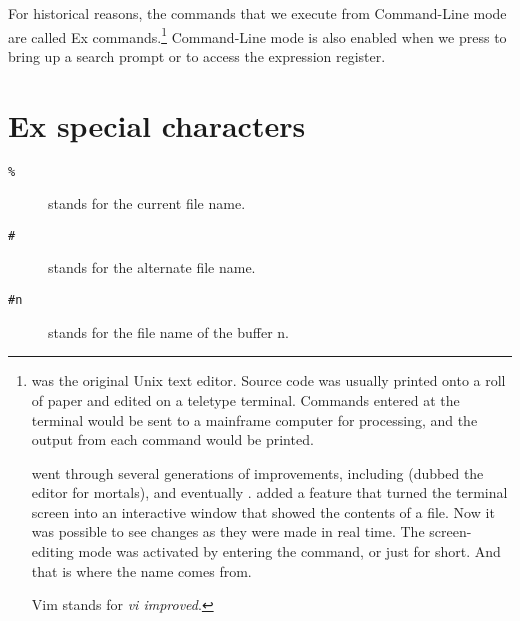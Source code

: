 For historical reasons, the commands that we execute from Command-Line mode are called Ex commands.\footnote{ was the original Unix text editor. Source code was usually printed onto a roll of paper and edited on a teletype terminal. Commands entered at the terminal would be sent to a mainframe computer for processing, and the output from each command would be printed.

 went through several generations of improvements, including  (dubbed the editor for mortals),  and eventually .  added a feature that turned the terminal screen into an interactive window that showed the contents of a file. Now it was possible to see changes as they were made in real time. The screen-editing mode was activated by entering the  command, or just  for short. And that is where the name  comes from.

Vim stands for \emph{vi improved}.} Command-Line mode is also enabled when we press \syntax{/} to bring up a search prompt or  to access the expression register.
\section{Ex special characters}
\begin{description}
  \item[\texttt{\%}] stands for the current file name.
  \item[\texttt{\#}] stands for the alternate file name.
  \item[\texttt{\#n}] stands for the file name of the buffer n.
\end{description}
